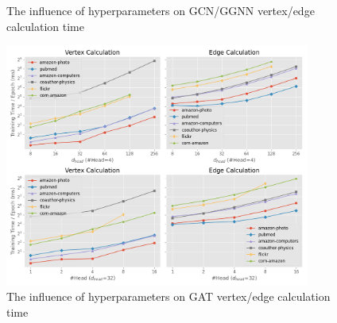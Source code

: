 \begin{figure}
	\centering
    \\
    \\
    \caption{The influence of hyperparameters on GCN/GGNN vertex/edge calculation time}
	\label{fig:exp_hyperparameter_on_vertex_edge_phase_time}
\end{figure}


\begin{figure}
	\centering
    \includegraphics[height=8cm]{figs/experiments/exp_hyperparameter_on_vertex_edge_phase_time_gat.png}
    \caption{The influence of hyperparameters on GAT vertex/edge calculation time}
	\label{fig:exp_hyperparameter_on_vertex_edge_phase_time_gat}
\end{figure}

